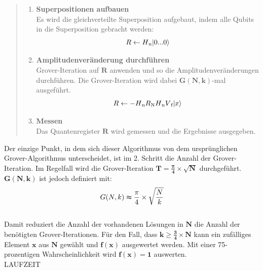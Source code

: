 \begin{quote}
    \begin{enumerate}
        \item \textbf{Superpositionen aufbauen}
        \\
        Es wird die gleichverteilte Superposition aufgebaut, indem alle Qubits in die Superposition gebracht werden:
        \\
        \begin{equation}
            R \leftarrow H\textsubscript{n} |0 ... 0\rangle 
        \end{equation}
        \item \textbf{Amplitudenveränderung durchführen}
        \\
        Grover-Iteration auf $\mathbf{R}$ anwenden und so die Amplitudenveränderungen durchführen. Die Grover-Iteration wird dabei $\mathbf{G(N,k)}$-mal ausgeführt.
        \\
        \begin{equation}
            R \leftarrow -H\textsubscript{n} R\textsubscript{N} H\textsubscript{n} V\textsubscript{f} |x\rangle
        \end{equation}
        \item \textbf{Messen}
        \\
        Das Quantenregister $\mathbf{R}$ wird gemessen und die Ergebnisse ausgegeben.
    \end{enumerate}
\end{quote}

Der einzige Punkt, in dem sich dieser Algorithmus von dem ursprünglichen Grover-Algorithmus unterscheidet, ist im 2. Schritt die Anzahl der Grover-Iteration. 
Im Regelfall wird die Grover-Iteration $\mathbf{T = \frac{\pmb\pi}{4} \times \sqrt{N}}$ durchgeführt. $\mathbf{G(N,k)}$ ist jedoch definiert mit:
\\
\begin{equation}
    {G(N,k) \thickapprox \frac{\pi}{4} \times \sqrt{\frac{N}{k}}}
\end{equation}
\\
Damit reduziert die Anzahl der vorhandenen Lösungen in $\mathbf{N}$ die Anzahl der benötigten Grover-Iterationen. 
Für den Fall, dass $\mathbf{k \geq \frac{3}{4} \times N}$ kann ein zufälliges Element $\mathbf{x}$ aus $\mathbf{N}$ gewählt und $\mathbf{f(x)}$ ausgewertet werden. 
Mit einer 75-prozentigen Wahrscheinlichkeit wird $\mathbf{f(x) = 1}$ auswerten.
\\
LAUFZEIT

